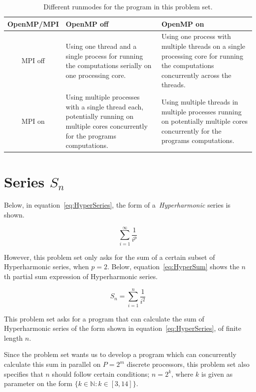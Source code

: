 \documentclass[fontsize=11pt,paper=a4,titlepage]{report}
\begin{document}
\begin{table}[h]
	\begin{tabularx}{\linewidth}{c|X|X|}
			OpenMP/MPI	& OpenMP off & OpenMP on	\\ \hline
			MPI off		& Using one thread and a single process for running the
computations serially on one processing core. & Using one process with multiple
threads on a single processing core for running the computations concurrently
across the threads. \\ \hline
			MPI on		& Using multiple processes with a single thread each,
potentially running on multiple cores concurrently for the programs
computations. & Using multiple threads in multiple processes running on
potentially multiple cores concurrently for the programs computations. \\
\hline
	\end{tabularx}
	\caption{Different runmodes for the program in this problem set.}
	\label{tab:RunModes}
\end{table}

\section{Series $S_n$}

Below, in equation~\ref{eq:HyperSeries}, the form of a~\textit{Hyperharmonic}
series is shown.

\begin{equation}
	\sum_{i=1}^{\infty} \frac{1}{i^p}
	\label{eq:HyperSeries}
\end{equation}

However, this problem set only asks for the sum of a certain subset of
Hyperharmonic series, when $p = 2$. Below, equation~\ref{eq:HyperSum} shows the 
$n$th partial sum expression of Hyperharmonic series.

\begin{equation}
	S_n = \sum_{i=1}^{n} \frac{1}{i^2}
	\label{eq:HyperSum}
\end{equation}

This problem set asks for a program that can calculate the sum of Hyperharmonic
series of the form shown in equation~\ref{eq:HyperSeries}, of finite length $n$.

Since the problem set wants us to develop a program which can concurrently
calculate this sum in parallel on $P = 2^m$ discrete processors, this problem
set also specifies that $n$ should follow certain conditions; $n = 2^k$, where
$k$ is given as parameter on the form $\{k \in \mathbb{N} : k \in [3, 14]\}$.
\end{document}
